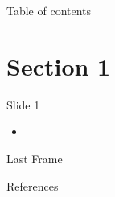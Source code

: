 \documentclass[compress,aspectratio=169]{beamer}
\begin{document}
	
	\begin{frame}[plain]
		\titlepage
	\end{frame}
	
	\begin{frame}[t]{Table of contents}
		\tableofcontents[subsectionstyle=hide/hide]
	\end{frame}
	
	
	\section{Section 1}
	
	\begin{frame}{Slide 1}
		\begin{itemize}
			\item 
		\end{itemize}
	\end{frame}
	
	\begin{frame}{Last Frame}
		\label{pg:lastpage} %
		
	\end{frame}
	
	\begin{frame}{References}
		\renewcommand*{\bibfont}{\normalfont\scriptsize}
		\printbibliography[heading=none]
	\end{frame}
	
\end{document}
